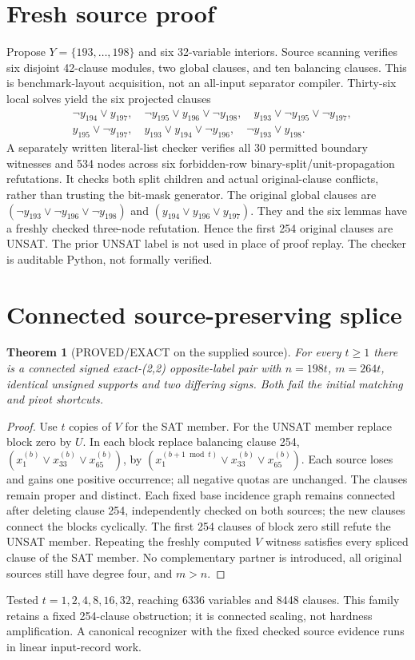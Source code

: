 \documentclass[11pt]{article}
\newtheorem{theorem}{Theorem}
\begin{document}
\section{Fresh source proof}
Propose $Y=\{193,\ldots,198\}$ and six 32-variable interiors. Source scanning verifies six disjoint 42-clause modules, two global clauses, and ten balancing clauses. This is benchmark-layout acquisition, not an all-input separator compiler. Thirty-six local solves yield the six projected clauses
\[
\begin{split}
&\neg y_{194}\vee y_{197},\quad \neg y_{195}\vee y_{196}\vee\neg y_{198},\quad y_{193}\vee\neg y_{195}\vee\neg y_{197},\\
&y_{195}\vee\neg y_{197},\quad y_{193}\vee y_{194}\vee\neg y_{196},\quad\neg y_{193}\vee y_{198}.
\end{split}
\]
A separately written literal-list checker verifies all 30 permitted boundary witnesses and 534 nodes across six forbidden-row binary-split/unit-propagation refutations. It checks both split children and actual original-clause conflicts, rather than trusting the bit-mask generator. The original global clauses are $(\neg y_{193}\vee\neg y_{196}\vee\neg y_{198})$ and $(y_{194}\vee y_{196}\vee y_{197})$. They and the six lemmas have a freshly checked three-node refutation. Hence the first 254 original clauses are UNSAT. The prior UNSAT label is not used in place of proof replay. The checker is auditable Python, not formally verified.
\section{Connected source-preserving splice}
\begin{theorem}[PROVED/EXACT on the supplied source]
For every $t\ge1$ there is a connected signed exact-(2,2) opposite-label pair with $n=198t$, $m=264t$, identical unsigned supports and two differing signs. Both fail the initial matching and pivot shortcuts.
\end{theorem}
\begin{proof}
Use $t$ copies of $V$ for the SAT member. For the UNSAT member replace block zero by $U$. In each block replace balancing clause 254, $(x_1^{(b)}\vee x_{33}^{(b)}\vee x_{65}^{(b)})$, by $(x_1^{(b+1\bmod t)}\vee x_{33}^{(b)}\vee x_{65}^{(b)})$. Each source loses and gains one positive occurrence; all negative quotas are unchanged. The clauses remain proper and distinct. Each fixed base incidence graph remains connected after deleting clause 254, independently checked on both sources; the new clauses connect the blocks cyclically. The first 254 clauses of block zero still refute the UNSAT member. Repeating the freshly computed $V$ witness satisfies every spliced clause of the SAT member. No complementary partner is introduced, all original sources still have degree four, and $m>n$.
\end{proof}
Tested $t=1,2,4,8,16,32$, reaching 6336 variables and 8448 clauses. This family retains a fixed 254-clause obstruction; it is connected scaling, not hardness amplification. A canonical recognizer with the fixed checked source evidence runs in linear input-record work.
\end{document}
